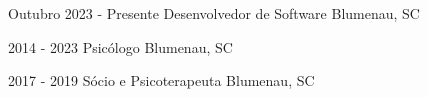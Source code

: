 
{Outubro 2023 - Presente}
{Desenvolvedor de Software}
{Blumenau, SC}

{2014 - 2023}
{Psicólogo}
{Blumenau, SC}

{2017 - 2019}
{Sócio e Psicoterapeuta}
{Blumenau, SC}